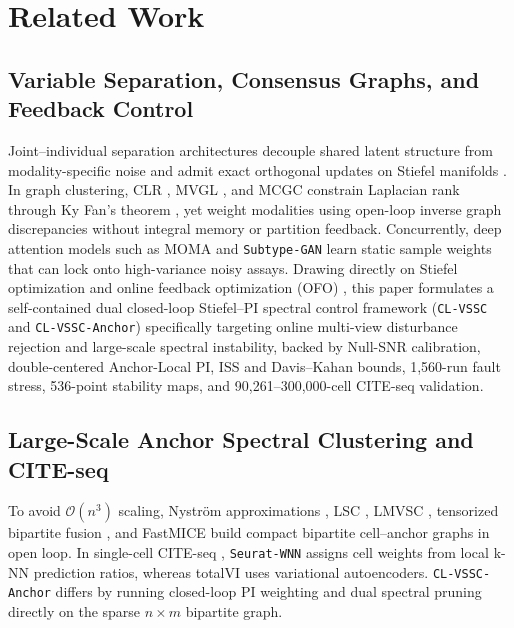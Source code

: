 \documentclass[journal]{IEEEtran}
\begin{document}
\section{Related Work}

\subsection{Variable Separation, Consensus Graphs, and Feedback Control}
Joint--individual separation architectures decouple shared latent structure from modality-specific noise \cite{lock2013jive} and admit exact orthogonal updates on Stiefel manifolds \cite{edelman1998geometry}. In graph clustering, CLR \cite{nie2016clr}, MVGL \cite{zhan2018mvgl}, and MCGC \cite{zhan2019mcgc} constrain Laplacian rank through Ky Fan's theorem \cite{fan1949theorem}, yet weight modalities using open-loop inverse graph discrepancies without integral memory or partition feedback. Concurrently, deep attention models such as MOMA \cite{moon2022moma} and \texttt{Subtype-\allowbreak GAN} \cite{yang2021subtypegan} learn static sample weights that can lock onto high-variance noisy assays. Drawing directly on Stiefel optimization \cite{edelman1998geometry} and online feedback optimization (OFO) \cite{astrom2008feedback,sontag2008iss,hauswirth2024ofo}, this paper formulates a self-contained dual closed-loop Stiefel--PI spectral control framework (\texttt{CL-\allowbreak VSSC} and \texttt{CL-\allowbreak VSSC-\allowbreak Anchor}) specifically targeting online multi-view disturbance rejection and large-scale spectral instability, backed by Null-SNR calibration, double-centered Anchor-Local PI, ISS and Davis--Kahan bounds, 1,560-run fault stress, 536-point stability maps, and 90,261--300,000-cell CITE-seq validation.

\subsection{Large-Scale Anchor Spectral Clustering and CITE-seq}
To avoid $\mathcal{O}(n^3)$ scaling, Nystr\"om approximations \cite{fowlkes2004nystrom}, LSC \cite{cai2015lsc}, LMVSC \cite{kang2020lmvsc}, tensorized bipartite fusion \cite{xia2023tbgl}, and FastMICE \cite{huang2023fastmice} build compact bipartite cell--anchor graphs in open loop. In single-cell CITE-seq \cite{stoeckius2017citeseq}, \texttt{Seurat-\allowbreak WNN} \cite{hao2021seuratv4} assigns cell weights from local k-NN prediction ratios, whereas totalVI \cite{gayoso2021totalvi} uses variational autoencoders. \texttt{CL-\allowbreak VSSC-\allowbreak Anchor} differs by running closed-loop PI weighting and dual spectral pruning directly on the sparse $n \times m$ bipartite graph.
\end{document}
